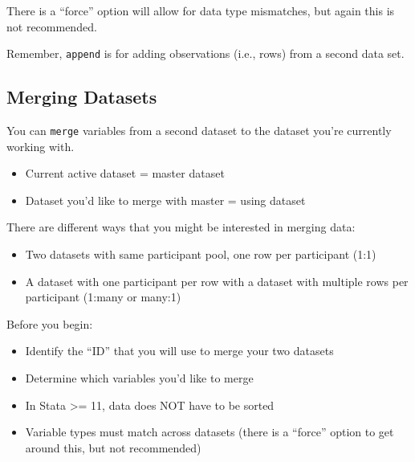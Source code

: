 \documentclass[]{book}
\providecommand{\tightlist}{%
  \setlength{\itemsep}{0pt}\setlength{\parskip}{0pt}}
\begin{document}
There is a ``force'' option will allow for data type mismatches, but again this is not recommended.

Remember, \texttt{append} is for adding observations (i.e., rows) from a second data set.

\hypertarget{merging-datasets}{%
\subsection{Merging Datasets}\label{merging-datasets}}

You can \texttt{merge} variables from a second dataset to the dataset you're currently working with.

\begin{itemize}
\tightlist
\item
  Current active dataset = master dataset
\item
  Dataset you'd like to merge with master = using dataset
\end{itemize}

There are different ways that you might be interested in merging data:

\begin{itemize}
\tightlist
\item
  Two datasets with same participant pool, one row per participant (1:1)
\item
  A dataset with one participant per row with a dataset with multiple rows per participant (1:many or many:1)
\end{itemize}

Before you begin:

\begin{itemize}
\tightlist
\item
  Identify the ``ID'' that you will use to merge your two datasets
\item
  Determine which variables you'd like to merge
\item
  In Stata \textgreater= 11, data does NOT have to be sorted
\item
  Variable types must match across datasets (there is a ``force'' option to get around this, but not recommended)
\end{itemize}
\end{document}
